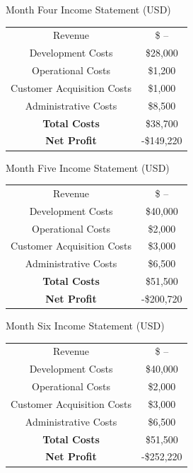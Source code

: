 \documentclass[12pt]{article}
\begin{document}
\vspace{1.5cm}
\begin{center}
	Month Four Income Statement (USD) \\[1.5ex]
	
	\begin{tabular}{c | c}
	Revenue & \$ -- \\
	Development Costs & \$28,000 \\
	Operational Costs & \$1,200 \\
	Customer Acquisition Costs & \$1,000 \\
	Administrative Costs & \$8,500 \\
	\textbf{Total Costs} & \$38,700 \\
	\textbf{Net Profit} & -\$149,220
	\end{tabular}
\end{center}
\vspace{1.5cm}
\begin{center}
	Month Five Income Statement (USD) \\[1.5ex]
	
	\begin{tabular}{c | c}
	Revenue & \$ -- \\
	Development Costs & \$40,000 \\
	Operational Costs & \$2,000 \\
	Customer Acquisition Costs & \$3,000 \\
	Administrative Costs & \$6,500 \\
	\textbf{Total Costs} & \$51,500 \\
	\textbf{Net Profit} & -\$200,720
	\end{tabular}
\end{center}
\vspace{1.5cm}
\begin{center}
	Month Six Income Statement (USD) \\[1.5ex]
	
	\begin{tabular}{c | c}
	Revenue & \$ -- \\
	Development Costs & \$40,000 \\
	Operational Costs & \$2,000 \\
	Customer Acquisition Costs & \$3,000 \\
	Administrative Costs & \$6,500 \\
	\textbf{Total Costs} & \$51,500 \\
	\textbf{Net Profit} & -\$252,220
	\end{tabular}
\end{center}
\end{document}
